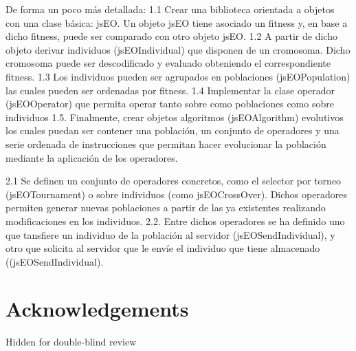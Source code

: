 \documentclass{llncs}
\begin{document}
De forma un poco más detallada:
1.1 Crear una biblioteca orientada a objetos con una clase básica: jsEO. Un objeto jsEO tiene asociado un fitness y, en base a dicho fitness, puede ser comparado con otro objeto jsEO.
1.2 A partir de dicho objeto derivar individuos (jsEOIndividual) que disponen de un cromosoma. Dicho cromosoma puede ser descodificado y evaluado obteniendo el correspondiente fitness.
1.3 Los individuos pueden ser agrupados en poblaciones (jsEOPopulation) las cuales pueden ser ordenadas por fitness.
1.4 Implementar la clase operador (jsEOOperator) que permita operar tanto sobre como poblaciones como sobre individuos
1.5. Finalmente, crear objetos algoritmos (jsEOAlgorithm) evolutivos los cuales puedan ser contener una población, un conjunto de operadores y una serie ordenada de instrucciones que permitan hacer evolucionar la población mediante la aplicación de los operadores.

2.1 Se definen un conjunto de operadores concretos, como el selector por torneo (jsEOTournament) o sobre individuos (como jsEOCrossOver). Dichos operadores permiten generar nuevas poblaciones a partir de las ya existentes realizando modificaciones en los individuos. 
2.2. Entre dichos operadores se ha definido uno que tansfiere un individuo de la población al servidor (jsEOSendIndividual), y otro que solicita al servidor que le envíe el individuo que tiene almacenado ((jsEOSendIndividual).

\section*{Acknowledgements}

Hidden for double-blind review




\end{document}
